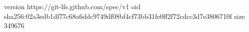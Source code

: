 version https://git-lfs.github.com/spec/v1
oid sha256:02a3edb1df77c68a6ddc9749df08bf4cf73bb31fe0ff2f72cdcc3d7e3806710f
size 349676
